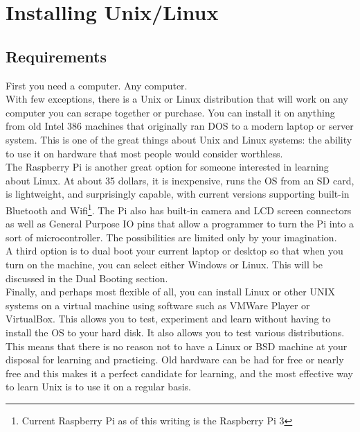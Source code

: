 \chapter{Installing Unix/Linux}

\section{Requirements}

First you need a computer. Any computer.\\

With few exceptions, there is a Unix or Linux distribution that will work on any computer you can scrape together or purchase.  You can install it on anything from old Intel 386 machines that originally ran DOS to a modern laptop or server system.  This is one of the great things about Unix and Linux systems: the ability to use it on hardware that most people would consider worthless.\\

The Raspberry Pi is another great option for someone interested in learning about Linux.  At about 35 dollars, it is inexpensive, runs the OS from an SD card, is lightweight, and surprisingly capable, with current versions supporting built-in Bluetooth and Wifi\footnote{Current Raspberry Pi as of this writing is the Raspberry Pi 3}.  The Pi also has built-in camera and LCD screen connectors as well as General Purpose IO pins that allow a programmer to turn the Pi into a sort of microcontroller.  The possibilities are limited only by your imagination.\\

A third option is to dual boot your current laptop or desktop so that when you turn on the machine, you can select either Windows or Linux.  This will be discussed in the Dual Booting section.\\

Finally, and perhaps most flexible of all, you can install Linux or other UNIX systems on a virtual machine using software such as VMWare Player or VirtualBox.  This allows you to test, experiment and learn without having to install the OS to your hard disk.  It also allows you to test various distributions.\\

This means that there is no reason not to have a Linux or BSD machine at your disposal for learning and practicing.  Old hardware can be had for free or nearly free and this makes it a perfect candidate for learning, and the most effective way to learn Unix is to use it on a regular basis.\\

